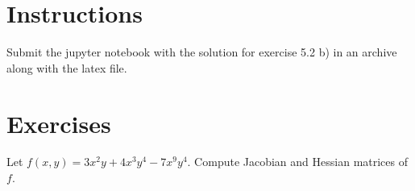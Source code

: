 \def\pathToRoot{../../}


\def\issolution{}




\section*{Instructions}
Submit the jupyter notebook with the solution for exercise 5.2 b) in an archive along with the latex file.


\section*{Exercises}

\begin{exercise}

Let $f(x,y) = 3x^2 y + 4x^3 y^4 - 7x^9 y^4$. Compute Jacobian and Hessian matrices of $f$.
\end{exercise}


\begin{solution}
\end{solution}


